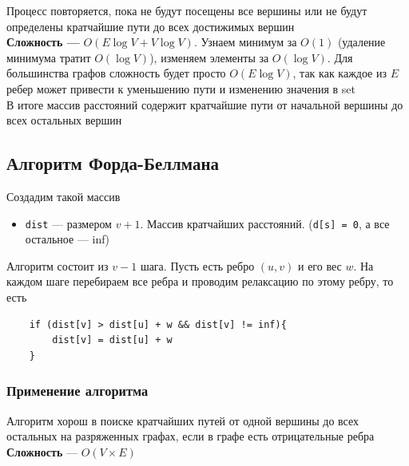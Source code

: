 \documentclass[a4paper]{article}
\newcommand{\code}[1]{\colorbox{codegray}{\texttt{#1}}}
\begin{document}
\indent Процесс повторяется, пока не будут посещены все вершины или не будут определены кратчайшие пути до всех достижимых вершин\\[2mm]
\indent \textbf{Сложность —} $O(E\log{V} + V\log{V})$. Узнаем минимум за $O(1)$ (удаление минимума тратит $O(\log{V})$), изменяем элементы за $O(\log{V})$. Для большинства графов сложность будет просто $O(E\log{V})$, так как каждое из $E$ ребер может привести к уменьшению пути и изменению значения в set\\[2mm]
\indent В итоге массив расстояний содержит кратчайшие пути от начальной вершины до всех остальных вершин


\subsection{Алгоритм Форда-Беллмана}
Создадим такой массив
\begin{itemize}
    \item \code{dist} — размером $v+1$. Массив кратчайших расстояний. (\code{d[s] = 0}, а все остальное — inf)
\end{itemize}
Алгоритм состоит из $v-1$ шага. Пусть есть ребро $(u,v)$ и его вес $w$. На каждом шаге перебираем все ребра и проводим релаксацию по этому ребру, то есть
\begin{lstlisting}
    if (dist[v] > dist[u] + w && dist[v] != inf){
        dist[v] = dist[u] + w
    }
\end{lstlisting}
\subsubsection*{Применение алгоритма}
Алгоритм хорош в поиске кратчайших путей от одной вершины до всех остальных на разряженных графах, если в графе есть отрицательные ребра\\[2mm]
\textbf{Сложность} — $O(V\times E)$
\end{document}
